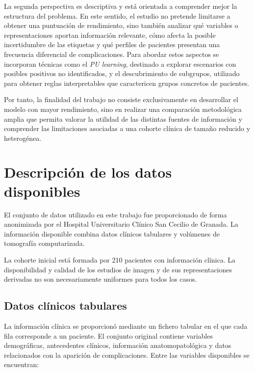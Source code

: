 La segunda perspectiva es descriptiva y está orientada a comprender mejor la estructura del problema. En este sentido, el estudio no pretende limitarse a obtener una puntuación de rendimiento, sino también analizar qué variables o representaciones aportan información relevante, cómo afecta la posible incertidumbre de las etiquetas y qué perfiles de pacientes presentan una frecuencia diferencial de complicaciones. Para abordar estos aspectos se incorporan técnicas como el \textit{PU learning}, destinado a explorar escenarios con posibles positivos no identificados, y el descubrimiento de subgrupos, utilizado para obtener reglas interpretables que caractericen grupos concretos de pacientes.

Por tanto, la finalidad del trabajo no consiste exclusivamente en desarrollar el modelo con mayor rendimiento, sino en realizar una comparación metodológica amplia que permita valorar la utilidad de las distintas fuentes de información y comprender las limitaciones asociadas a una cohorte clínica de tamaño reducido y heterogénea.



\section{Descripción de los datos disponibles}
\label{sec:descripcion_datos}

El conjunto de datos utilizado en este trabajo fue proporcionado de forma anonimizada por el Hospital Universitario Clínico San Cecilio de Granada. La información disponible combina datos clínicos tabulares y volúmenes de tomografía computarizada.

La cohorte inicial está formada por 210 pacientes con información clínica. La disponibilidad y calidad de los estudios de imagen y de sus representaciones derivadas no son necesariamente uniformes para todos los casos.

\subsection{Datos clínicos tabulares}\label{sec:variables_disponibles}

La información clínica se proporcionó mediante un fichero tabular en el que cada fila corresponde a un paciente. El conjunto original contiene variables demográficas, antecedentes clínicos, información anatomopatológica y datos relacionados con la aparición de complicaciones. Entre las variables disponibles se encuentran:

